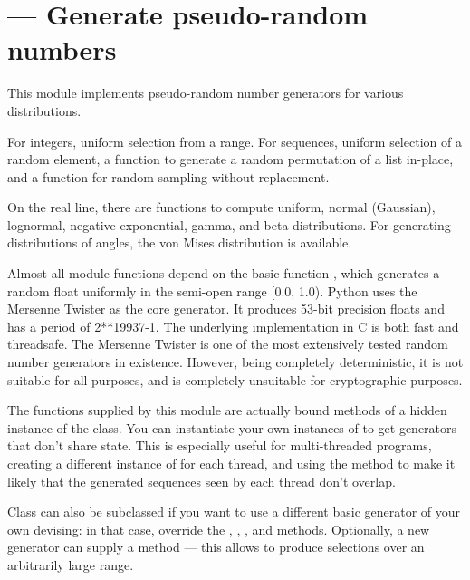 \section{ ---
         Generate pseudo-random numbers}



This module implements pseudo-random number generators for various
distributions.

For integers, uniform selection from a range.
For sequences, uniform selection of a random element, a function to
generate a random permutation of a list in-place, and a function for
random sampling without replacement.

On the real line, there are functions to compute uniform, normal (Gaussian),
lognormal, negative exponential, gamma, and beta distributions.
For generating distributions of angles, the von Mises distribution
is available.

Almost all module functions depend on the basic function
, which generates a random float uniformly in
the semi-open range [0.0, 1.0).  Python uses the Mersenne Twister as
the core generator.  It produces 53-bit precision floats and has a
period of 2**19937-1.  The underlying implementation in C
is both fast and threadsafe.  The Mersenne Twister is one of the most
extensively tested random number generators in existence.  However, being
completely deterministic, it is not suitable for all purposes, and is
completely unsuitable for cryptographic purposes.

The functions supplied by this module are actually bound methods of a
hidden instance of the  class.  You can
instantiate your own instances of  to get generators
that don't share state.  This is especially useful for multi-threaded
programs, creating a different instance of  for each
thread, and using the  method to make it likely that the
generated sequences seen by each thread don't overlap.

Class  can also be subclassed if you want to use a
different basic generator of your own devising: in that case, override
the , , ,
 and  methods.
Optionally, a new generator can supply a 
method --- this allows  to produce selections
over an arbitrarily large range.


